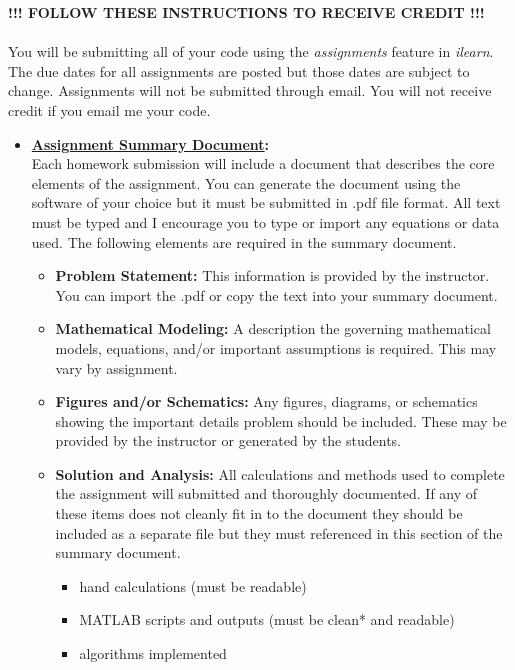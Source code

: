 \documentclass[12pt]{article}
\begin{document}
    
	{\bf !!! FOLLOW THESE INSTRUCTIONS TO RECEIVE CREDIT !!!}\\\\
    You will be submitting all of your code using the {\it assignments} feature in {\it ilearn}. The due dates for all assignments are posted but those dates are subject to change. Assignments will not be submitted through email. You will not receive credit if you email me your code. \\
    
    \begin{itemize}
    
	\item {\bf \underline{ Assignment Summary Document}:} \vspace{2mm} \\  
Each homework submission will include a document that describes the core elements of the assignment. You can generate the document using the software of your choice but it must be submitted in .pdf file format. All text must be typed and I encourage you to type or import any equations or data used. The following elements are required in the summary document.\\
	\begin{itemize}
	\item{\bf Problem Statement:} This information is provided by the instructor. You can import the .pdf or copy the text into your summary document. \\
	\item {\bf Mathematical Modeling:}  A description the governing mathematical models, equations, and/or important assumptions is required. This may vary by assignment. \\
	\item {\bf Figures and/or Schematics:}  Any figures, diagrams, or schematics showing the important details problem should be included. These may be provided by the instructor or generated by the students. \\

	\item {\bf Solution and Analysis:}  All calculations and methods used to complete the assignment will submitted and thoroughly documented. If any of these items does not cleanly fit in to the document they should be included as a separate file but they must referenced in this section of the summary document.   
\begin{itemize}
	\item hand calculations (must be readable)
	\item MATLAB scripts and outputs (must be clean* and readable)
	\item algorithms implemented
\end{itemize}
 

\end{itemize}
\end{itemize}
\end{document}
